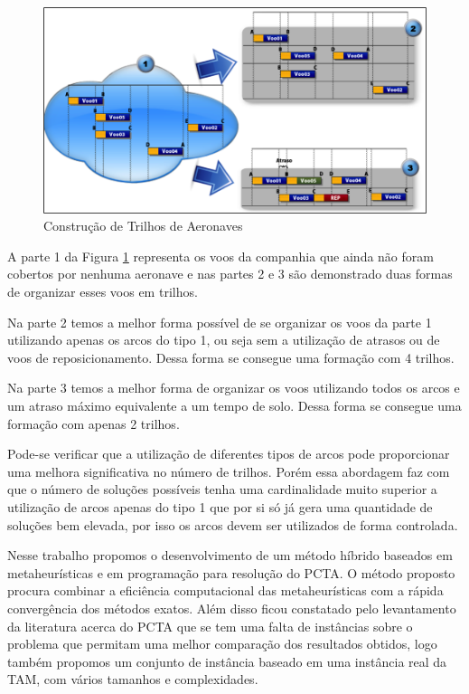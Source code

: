 \begin{figure}[ht]
	\centering
	\includegraphics[scale=0.9]{./img/arpexample}
	\caption{Construção de Trilhos de Aeronaves}
	\label{arpexample}
\end{figure}

A parte 1 da Figura \ref{arpexample} representa os voos da companhia que ainda não foram cobertos por nenhuma aeronave e nas partes 2 e 3 são demonstrado duas formas de organizar esses voos em trilhos. 

	Na parte 2 temos a melhor forma possível de se organizar os voos da parte 1 utilizando apenas os arcos do tipo 1, ou seja sem a utilização de atrasos ou de voos de reposicionamento. Dessa forma se consegue uma formação com 4 trilhos.

	Na parte 3 temos a melhor forma de organizar os voos utilizando todos os arcos e um atraso máximo equivalente a um tempo de solo. Dessa forma se consegue uma formação com apenas 2 trilhos.

	Pode-se verificar que a utilização de diferentes tipos de arcos pode proporcionar uma melhora significativa  no número de trilhos. Porém essa abordagem faz com que o número de soluções possíveis tenha uma cardinalidade muito superior a utilização de arcos apenas do tipo 1 que por si só já gera uma quantidade de soluções bem elevada, por isso os arcos devem ser utilizados de forma controlada. 

	Nesse trabalho propomos o desenvolvimento de um método híbrido baseados em metaheurísticas e em programação para resolução do PCTA. O método proposto procura combinar a eficiência computacional das metaheurísticas com a rápida convergência dos métodos exatos. Além disso ficou constatado pelo levantamento da literatura acerca do PCTA que se tem uma falta de instâncias sobre o problema que permitam uma melhor comparação dos resultados obtidos, logo também propomos um conjunto de instância baseado em uma instância real da TAM, com vários tamanhos e complexidades. 

